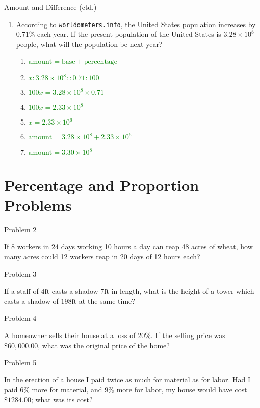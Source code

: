 \documentclass[]{beamer}
\begin{document}
\begin{frame}{Amount and Difference (ctd.)}
    \begin{enumerate}[<+->]
        \item According to {\tt worldometers.info}, the United States
        population increases by $0.71\%$ each year.  If the present
        population of the United States is $3.28 \times 10^{8}$
        people, what will the population be next year?

        \begin{enumerate}
            \item \textcolor{green}{$\mathrm{amount} = \mathrm{base} + \mathrm{percentage} $}
            \item \textcolor{green}{$x : 3.28\times 10^8 :: 0.71 : 100 $}
            \item \textcolor{green}{$100x = 3.28\times 10^8 \times 0.71 $}
            \item \textcolor{green}{$100x = 2.33\times 10^8  $}
            \item \textcolor{green}{$x = 2.33\times 10^6 $}
            \item \textcolor{green}{$\mathrm{amount} = 3.28 \times 10^8 + 2.33 \times 10^6$}
            \item \textcolor{green}{$\mathrm{amount} = 3.30\times 10^8 $}
        \end{enumerate}
    \end{enumerate}
\end{frame}

\section{Percentage and Proportion Problems}

\begin{frame}{Problem 2}

  If 8 workers in 24 days working 10 hours a day can reap 48 acres of wheat, how many acres could 12 workers reap in 20 days of 12 hours each?

\end{frame}

\begin{frame}{Problem 3}

  If a staff of $4\mathrm{ft}$ casts a shadow $7\mathrm{ft}$ in length, what is the height of a tower which casts a shadow of $198\mathrm{ft}$ at the same time? 

\end{frame}

\begin{frame}{Problem 4}

  A homeowner sells their house at a loss of $20\%$.  If the selling price was 
  $\$60,000.00$, what was the original price of the home?

\end{frame}

\begin{frame}{Problem 5}

  In the erection of a house I paid twice as much for material
  as for labor.  Had I paid $6\%$ more for material, and $9\%$ more
  for labor, my house would have cost $\$1284.00$; what was its
  cost?
\end{frame}
\end{document}
